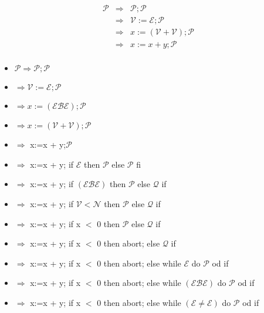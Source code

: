 
\begin{eqnarray*}
\mathcal{P} &\Rightarrow &\mathcal{P};\mathcal{P} \\
&\Rightarrow &\mathcal{V}:=\mathcal{E};\mathcal{P} \\
&\Rightarrow &x:=(\mathcal{V}+\mathcal{V});\mathcal{P} \\
&\Rightarrow &x:=x+y;\mathcal{P} \\
&&
\end{eqnarray*}

\begin{itemize}
\item $\mathcal{P}\Rightarrow \mathcal{P};\mathcal{P}$

\item $\Rightarrow \mathcal{V}:=\mathcal{E};\mathcal{P}$

\item $\Rightarrow x:=(\mathcal{E}\mathcal{B}\mathcal{E});\mathcal{P}$

\item $\Rightarrow x:=(\mathcal{V}+\mathcal{V});\mathcal{P}$

\item $\Rightarrow $ x:=x + y;$\mathcal{P}$

\item $\Rightarrow $ x:=x + y; if $\mathcal{E}$ then $\mathcal{P}$ else $%
\mathcal{P}$ fi

\item $\Rightarrow $ x:=x + y; if $(\mathcal{E}\mathcal{B}\mathcal{E})$ then 
$\mathcal{P}$ else $\mathcal{Q}$ if

\item $\Rightarrow $ x:=x + y; if $\mathcal{V}<\mathcal{N}$ then $\mathcal{P}
$ else $\mathcal{Q}$ if

\item $\Rightarrow $ x:=x + y; if x $<$ 0 then $\mathcal{P}$ else $\mathcal{Q%
}$ if

\item $\Rightarrow $ x:=x + y; if x $<$ 0 then abort; else $\mathcal{Q}$ if

\item $\Rightarrow $ x:=x + y; if x $<$ 0 then abort; else while $\mathcal{E}
$ do $\mathcal{P}$ od if

\item $\Rightarrow $ x:=x + y; if x $<$ 0 then abort; else while $(\mathcal{E%
}\mathcal{B}\mathcal{E})$ do $\mathcal{P}$ od if

\item $\Rightarrow $ x:=x + y; if x $<$ 0 then abort; else while $(\mathcal{E%
}\neq \mathcal{E})$ do $\mathcal{P}$ od if


\end{itemize}
